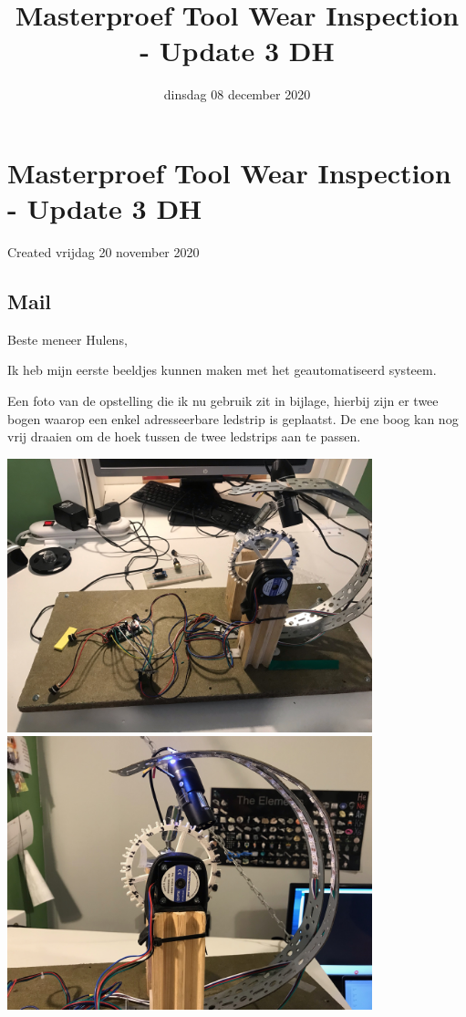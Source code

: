 \documentclass{scrartcl}
\title{Masterproef Tool Wear Inspection - Update 3 DH}
\date{dinsdag 08 december 2020}
\author{}
\begin{document}
\maketitle

		\section{Masterproef Tool Wear Inspection - Update 3 DH}

Created vrijdag 20 november 2020



\subsection{Mail}

Beste meneer Hulens,

 

Ik heb mijn eerste beeldjes kunnen maken met het geautomatiseerd systeem.

Een foto van de opstelling die ik nu gebruik zit in bijlage, hierbij zijn er twee bogen waarop een enkel adresseerbare ledstrip is geplaatst. De ene boog kan nog vrij draaien om de hoek tussen de twee ledstrips aan te passen.



\includegraphics[width=4.166667in, keepaspectratio=true]{./Masterproef_Tool_Wear_Inspection_-_Update_3_DH/rechts_kabels.jpeg}\includegraphics[width=4.166667in, keepaspectratio=true]{./Masterproef_Tool_Wear_Inspection_-_Update_3_DH/rechts.jpeg}
\end{document}
